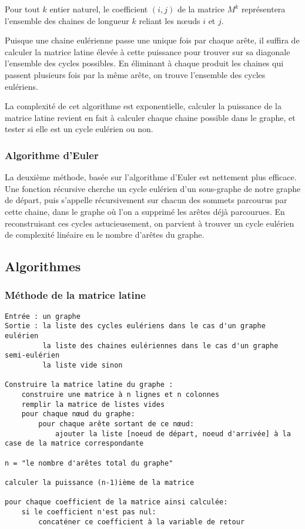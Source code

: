 \documentclass{scrartcl}
\begin{document}
      Pour tout $k$ entier naturel, le coefficient $(i,j)$ de la matrice $M^k$
      représentera l'ensemble des chaines de longueur $k$ reliant les nœuds $i$
      et $j$.
      
      Puisque une chaine eulérienne passe une unique fois par chaque arête, il
      suffira de calculer la matrice latine élevée à cette puissance pour
      trouver sur sa diagonale l'ensemble des cycles possibles. En éliminant à
      chaque produit les chaines qui passent plusieurs fois par la même arête,
      on trouve l'ensemble des cycles eulériens.

      La complexité de cet algorithme est exponentielle, calculer la puissance
      de la matrice latine revient en fait à calculer chaque chaine possible dans
      le graphe, et tester si elle est un cycle eulérien ou non.
	
    \subsubsection{Algorithme d'Euler}
      La deuxième méthode, basée sur l'algorithme d'Euler est nettement plus
      efficace. Une fonction récursive cherche un cycle eulérien d'un
      sous-graphe de notre graphe de départ, puis s'appelle récursivement sur
      chacun des sommets parcourus par cette chaine, dans le graphe où l'on a
      supprimé les arêtes déjà parcourues. En reconstruisant ces cycles
      astucieusement, on parvient à trouver un cycle eulérien de complexité
      linéaire en le nombre d'arêtes du graphe. 

  \subsection{Algorithmes}
    \subsubsection{Méthode de la matrice latine}
      \begin{lstlisting}
Entrée : un graphe
Sortie : la liste des cycles eulériens dans le cas d'un graphe eulérien
         la liste des chaines eulériennes dans le cas d'un graphe semi-eulérien
         la liste vide sinon

Construire la matrice latine du graphe :
    construire une matrice à n lignes et n colonnes
    remplir la matrice de listes vides
    pour chaque nœud du graphe:
        pour chaque arête sortant de ce nœud:
            ajouter la liste [noeud de départ, noeud d'arrivée] à la case de la matrice correspondante

n = "le nombre d'arêtes total du graphe"

calculer la puissance (n-1)ième de la matrice

pour chaque coefficient de la matrice ainsi calculée:
    si le coefficient n'est pas nul:
        concaténer ce coefficient à la variable de retour
      \end{lstlisting}
\end{document}
